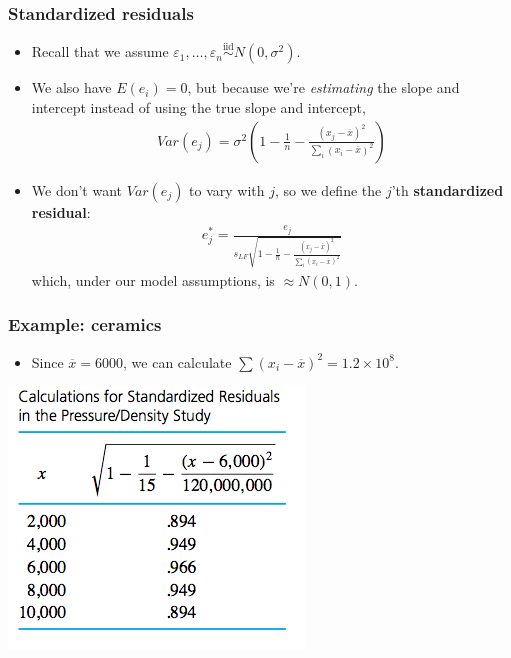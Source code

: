 \documentclass[handout]{beamer}\usepackage[]{graphicx}\usepackage[]{color}
\providecommand{\e}{\varepsilon}
\providecommand{\ov}[1]{\overline{#1}}
\numberwithin{equation}{section}
\begin{document}
\begin{frame}
\frametitle{Standardized residuals}
\begin{itemize}
\item Recall that we assume $\e_1, \ldots, \e_n \stackrel{\text{iid}}{\sim} N(0, \sigma^2)$.
\pause \item We also have $E(e_i) = 0$, but because we're \emph{estimating} the slope and intercept instead of using the true slope and intercept,
\pause \begin{align*}
Var(e_j) = \sigma^2 \left ( 1 - \frac{1}{n} - \frac{(x_j-\ov{x})^2}{ \sum_i (x_i - \ov{x})^2} \right )
\end{align*}
\pause \item We don't want $Var(e_j)$ to vary with $j$, so we define the $j$'th {\bf standardized residual}:
\pause \begin{align*}
e_j^* = \frac{e_j}{s_{LF}\sqrt{ 1 - \frac{1}{n} - \frac{(x_j-\ov{x})^2}{ \sum_i (x_i - \ov{x})^2} }}
\end{align*}
which, under our model assumptions, is $\approx N(0,1)$.
\end{itemize}
\end{frame}

\begin{frame}
\frametitle{Example: ceramics} \small
\begin{itemize}
\item Since $\ov{x} = 6000$, we can calculate $\sum(x_i - \ov{x})^2 = 1.2 \times 10^8$.
\end{itemize}
\begin{center}
 \includegraphics{../../fig/srescalc.png}
\end{center}
\end{frame}
\end{document}
